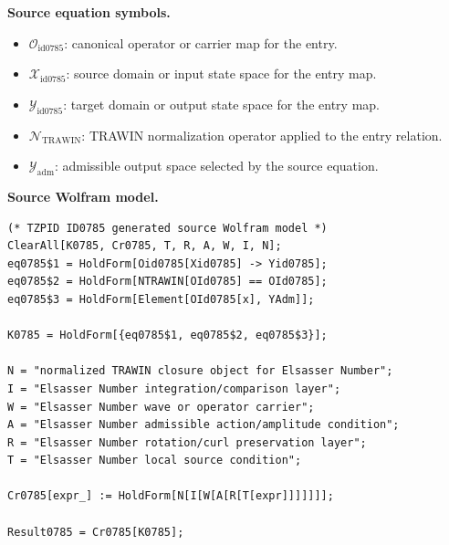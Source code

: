 \begin{minipage}[t]{0.49\linewidth}
\begingroup
\small
\raggedright
\textbf{Source equation symbols.}\par
\begin{itemize}[leftmargin=1.35em,itemsep=1pt,topsep=1pt,parsep=0pt]
    \item $\mathcal{O}_{\mathrm{id0785}}$: canonical operator or carrier map for the entry.
    \item $\mathcal{X}_{\mathrm{id0785}}$: source domain or input state space for the entry map.
    \item $\mathcal{Y}_{\mathrm{id0785}}$: target domain or output state space for the entry map.
    \item $\mathcal{N}_{\mathrm{TRAWIN}}$: TRAWIN normalization operator applied to the entry relation.
    \item $\mathcal{Y}_{\mathrm{adm}}$: admissible output space selected by the source equation.
\end{itemize}
\endgroup
\end{minipage}\hfill
\begin{minipage}[t]{0.47\linewidth}
\begingroup
\scriptsize
\raggedright
\textbf{Source Wolfram model.}\par
\begin{Verbatim}[fontsize=\tiny,breaklines=true,breakanywhere=true]
(* TZPID ID0785 generated source Wolfram model *)
ClearAll[K0785, Cr0785, T, R, A, W, I, N];
eq0785$1 = HoldForm[Oid0785[Xid0785] -> Yid0785];
eq0785$2 = HoldForm[NTRAWIN[OId0785] == OId0785];
eq0785$3 = HoldForm[Element[OId0785[x], YAdm]];

K0785 = HoldForm[{eq0785$1, eq0785$2, eq0785$3}];

N = "normalized TRAWIN closure object for Elsasser Number";
I = "Elsasser Number integration/comparison layer";
W = "Elsasser Number wave or operator carrier";
A = "Elsasser Number admissible action/amplitude condition";
R = "Elsasser Number rotation/curl preservation layer";
T = "Elsasser Number local source condition";

Cr0785[expr_] := HoldForm[N[I[W[A[R[T[expr]]]]]]];

Result0785 = Cr0785[K0785];
\end{Verbatim}
\endgroup
\end{minipage}

